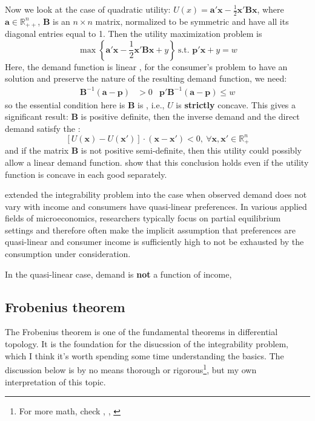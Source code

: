 Now we look at the case of quadratic utility: $U(x)=\mathbf{a}'\mathbf{x}-\frac{1}{2}\mathbf{x}'\mathbf{B}\mathbf{x}$, where $\mathbf{a}\in \mathbb{R}^n_{++}$, $\mathbf{B}$ is an $n\times n$ matrix, normalized to be symmetric and have all its diagonal entries equal to 1. Then the utility maximization problem is
$$
\max \left\{ \mathbf{a}'\mathbf{x}-\frac{1}{2}\mathbf{x}'\mathbf{B}\mathbf{x}+y \right\}\ \text{s.t. }\mathbf{p}'\mathbf{x}+y=w
$$
Here, the demand function is linear , for the consumer's problem to have an  solution and preserve the  nature of the resulting demand function, we need:
\begin{align*}
    \mathbf{B}^{-1}(\mathbf{a}-\mathbf{p})&>0 & \mathbf{p}'\mathbf{B}^{-1}(\mathbf{a}-\mathbf{p})\leq w
\end{align*}
so the essential condition here is $\mathbf{B}$ is , i.e., $U$ is \textbf{strictly} concave. This gives a significant result: $\mathbf{B}$ is positive definite, then the inverse demand and the direct demand satisfy the :
$$
\left[ U(\mathbf{x}) - U(\mathbf{x}') \right]\cdot \left( \mathbf{x}-\mathbf{x}' \right) <0,\ \forall \mathbf{x},\mathbf{x}'\in \mathbb{R}^n_{+}
$$
and if the matrix $\mathbf{B}$ is not positive semi-definite, then this utility could  possibly allow a linear demand function. \citeauthor*{amir2017microeconomic} show that this conclusion holds even if the utility function is concave in each good separately. 

\citet*{nocke2017quasi} extended the integrability problem into the case when observed demand does not vary with income and consumers have quasi-linear preferences. In various applied fields of microeconomics, researchers typically focus on partial equilibrium settings and therefore often make the implicit assumption that preferences are quasi-linear and consumer income is sufficiently high to not be exhausted by the consumption under consideration.

In the quasi-linear case, demand is \textbf{not} a function of income, 

\subsection{Frobenius theorem}\label{sssec:frobenius_theorem}
The Frobenius theorem is one of the fundamental theorems in differential topology. It is the foundation for the disucssion of the integrability problem, which I think it's worth spending some time understanding the basics. The discussion below is by no means thorough or rigorous\footnote{For more math, check \cite{sternberg1999lectures}, \cite{warner1983foundations}, \cite{mccleary2013geometry}}, but my own interpretation of this topic.

